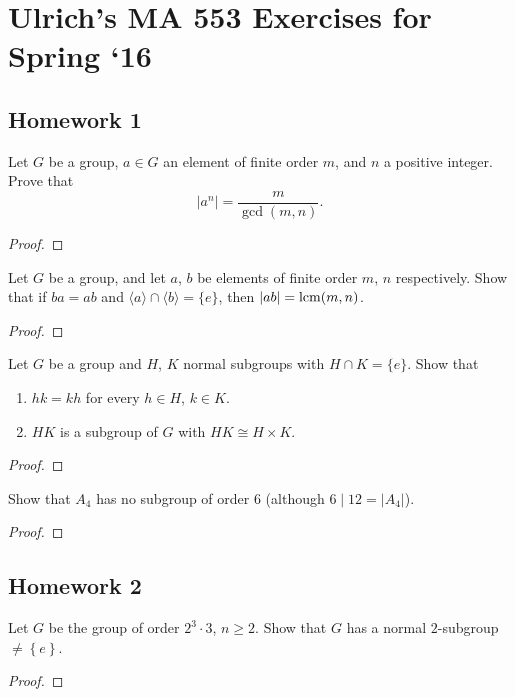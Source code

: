 \chapter{Ulrich's MA 553 Exercises for Spring `16}
\section{Homework 1}
\begin{exercise}
Let $G$ be a group, $a\in G$ an element of finite order $m$, and $n$ a
positive integer. Prove that
\[
|a^n|=\frac{m}{\gcd(m,n)}.
\]
\end{exercise}
\begin{proof}

\end{proof}

\begin{exercise}
Let $G$ be a group, and let $a$, $b$ be elements of finite order $m$, $n$
respectively. Show that if $ba=ab$ and $\langle a\rangle\cap\langle
b\rangle=\{e\}$, then $|ab|=\operatorname{lcm}(m,n)$.
\end{exercise}
\begin{proof}
\end{proof}

\begin{exercise}
Let $G$ be a group and $H$, $K$ normal subgroups with $H\cap K=\{e\}$. Show
that
\begin{enumerate}[label=(\alph*)]
\item $hk=kh$ for every $h\in H$, $k\in K$.
\item $HK$ is a subgroup of $G$ with $HK\cong H\times K$.
\end{enumerate}
\end{exercise}
\begin{proof}
\end{proof}

\begin{exercise}
Show that $A_4$ has no subgroup of order $6$ (although $6\mid 12=|A_4|$).
\end{exercise}
\begin{proof}
\end{proof}

\section{Homework 2}
\begin{exercise}
Let $G$ be the group of order $2^3\cdot 3$, $n\geq 2$. Show that $G$ has a
normal $2$-subgroup $\neq\left\{e\right\}$.
\end{exercise}
\begin{proof}
\end{proof}

